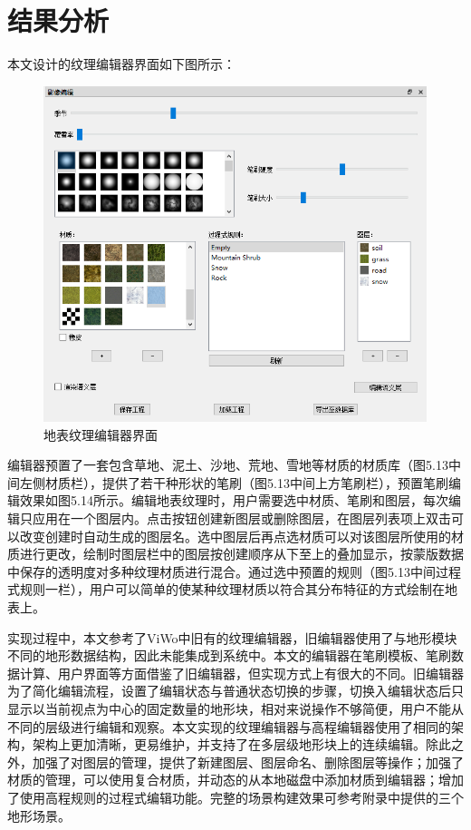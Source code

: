 \section{结果分析}
本文设计的纹理编辑器界面如下图所示：\par
\begin{figure}[htb]
    \centering
    \includegraphics[height=9.8cm ,width=11.2cm]{figures/maskinterface.PNG}
  \caption{地表纹理编辑器界面}
  \end{figure}
编辑器预置了一套包含草地、泥土、沙地、荒地、雪地等材质的材质库（图5.13中间左侧材质栏），提供了若干种形状的笔刷（图5.13中间上方笔刷栏），预置笔刷编辑效果如图5.14所示。编辑地表纹理时，用户需要选中材质、笔刷和图层，每次编辑只应用在一个图层内。点击按钮创建新图层或删除图层，在图层列表项上双击可以改变创建时自动生成的图层名。选中图层后再点选材质可以对该图层所使用的材质进行更改，绘制时图层栏中的图层按创建顺序从下至上的叠加显示，按蒙版数据中保存的透明度对多种纹理材质进行混合。通过选中预置的规则（图5.13中间过程式规则一栏），用户可以简单的使某种纹理材质以符合其分布特征的方式绘制在地表上。\par
实现过程中，本文参考了ViWo中旧有的纹理编辑器，旧编辑器使用了与地形模块不同的地形数据结构，因此未能集成到系统中。本文的编辑器在笔刷模板、笔刷数据计算、用户界面等方面借鉴了旧编辑器，但实现方式上有很大的不同。旧编辑器为了简化编辑流程，设置了编辑状态与普通状态切换的步骤，切换入编辑状态后只显示以当前视点为中心的固定数量的地形块，相对来说操作不够简便，用户不能从不同的层级进行编辑和观察。本文实现的纹理编辑器与高程编辑器使用了相同的架构，架构上更加清晰，更易维护，并支持了在多层级地形块上的连续编辑。除此之外，加强了对图层的管理，提供了新建图层、图层命名、删除图层等操作；加强了材质的管理，可以使用复合材质，并动态的从本地磁盘中添加材质到编辑器；增加了使用高程规则的过程式编辑功能。完整的场景构建效果可参考附录中提供的三个地形场景。\par

